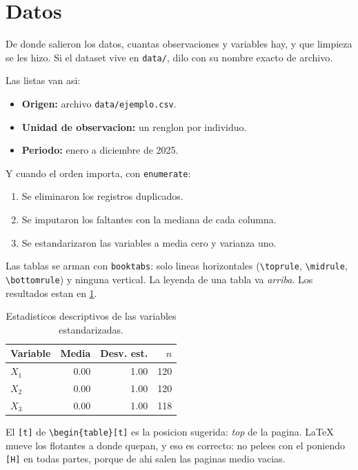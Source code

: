 
\section{Datos}\label{sec:datos}

De donde salieron los datos, cuantas observaciones y variables hay, y que
limpieza se les hizo. Si el dataset vive en \texttt{data/}, dilo con su nombre
exacto de archivo.

Las listas van asi:

\begin{itemize}
  \item \textbf{Origen:} archivo \texttt{data/ejemplo.csv}.
  \item \textbf{Unidad de observacion:} un renglon por individuo.
  \item \textbf{Periodo:} enero a diciembre de 2025.
\end{itemize}

Y cuando el orden importa, con \verb|enumerate|:

\begin{enumerate}
  \item Se eliminaron los registros duplicados.
  \item Se imputaron los faltantes con la mediana de cada columna.
  \item Se estandarizaron las variables a media cero y varianza uno.
\end{enumerate}

Las tablas se arman con \texttt{booktabs}: solo lineas horizontales
(\verb|\toprule|, \verb|\midrule|, \verb|\bottomrule|) y ninguna vertical. La
leyenda de una tabla va \emph{arriba}. Los resultados estan en
\cref{tab:descriptivos}.

\begin{table}[t]
  \centering
  \caption{Estadisticos descriptivos de las variables estandarizadas.}
  \label{tab:descriptivos}
  \begin{tabular}{lrrr}
    \toprule
    Variable & Media & Desv. est. & $n$ \\
    \midrule
    $X_1$ & 0.00 & 1.00 & 120 \\
    $X_2$ & 0.00 & 1.00 & 120 \\
    $X_3$ & 0.00 & 1.00 & 118 \\
    \bottomrule
  \end{tabular}
\end{table}

El \texttt{[t]} de \verb|\begin{table}[t]| es la posicion sugerida: \emph{top}
de la pagina. LaTeX mueve los flotantes a donde quepan, y eso es correcto: no
pelees con el poniendo \texttt{[H]} en todas partes, porque de ahi salen las
paginas medio vacias.
